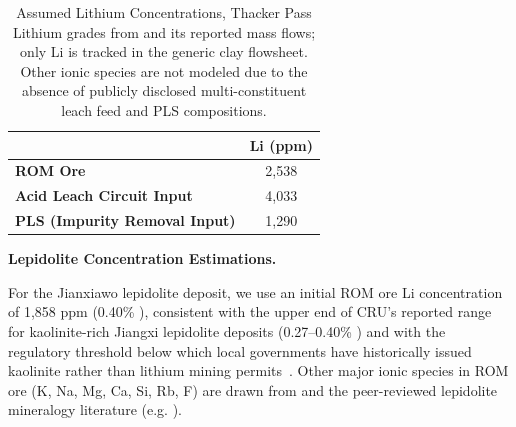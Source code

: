 \documentclass{article}
\renewcommand\_{\textunderscore\allowbreak}
\begin{document}
\begin{table}[h]
\centering
\caption[Assumed Lithium Concentrations, Thacker Pass]{Assumed Lithium Concentrations, Thacker Pass \\
\small Lithium grades from \citet{sgscanadaincSK1300Technical2024} and its reported mass flows; only Li is tracked in the generic clay flowsheet. Other ionic species are not modeled due to the absence of publicly disclosed multi-constituent leach feed and PLS compositions.}
\label{tab:c-thackerpass-compositions}
\begin{tabular}{|l|c|}
\hline
 & \textbf{Li (ppm)} \\
\hline
\textbf{ROM Ore}                         & 2,538 \\
\hline
\textbf{Acid Leach Circuit Input}        & 4,033 \\
\hline
\textbf{PLS (Impurity Removal Input)}    & 1,290 \\
\hline
\end{tabular}
\end{table}

\medskip
\noindent\textbf{Lepidolite Concentration Estimations.}\quad

For the Jianxiawo lepidolite deposit, we use an initial ROM ore Li concentration of 1,858 ppm (0.40\% ), consistent with the upper end of CRU's reported range for kaolinite-rich Jiangxi lepidolite deposits (0.27--0.40\% ) and with the regulatory threshold below which local governments have historically issued kaolinite rather than lithium mining permits~\cite{zhangChinaHasDomestic2025}. Other major ionic species in ROM ore (K, Na, Mg, Ca, Si, Rb, F) are drawn from \citet{garrettHandbookLithiumNatural2004} and the peer-reviewed lepidolite mineralogy literature (e.g. \cite{gaoLithiumExtractionHard2023, parkEffectiveLithiumExtraction2023}).
\end{document}
